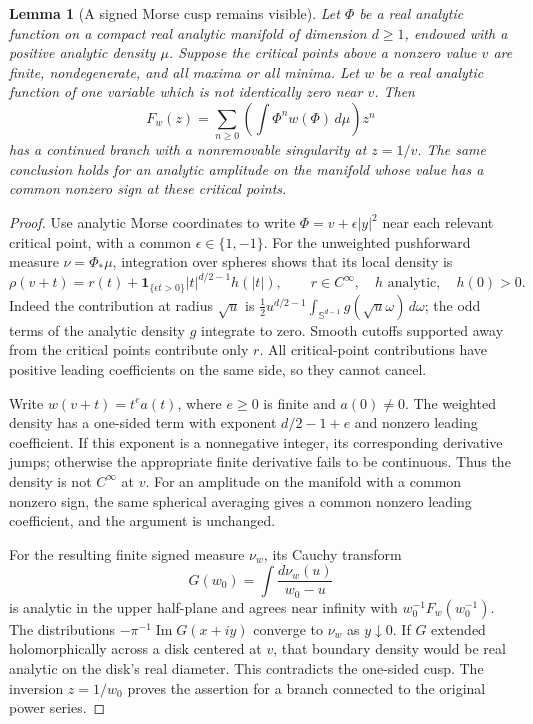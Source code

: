 \documentclass[11pt,a4paper]{article}
\newtheorem{lemma}[theorem]{Lemma}
\theoremstyle{definition}
\theoremstyle{remark}
\numberwithin{equation}{section}
\begin{document}
\begin{lemma}[A signed Morse cusp remains visible]\label{A:lem:morse-cusp}
Let $\Phi$ be a real analytic function on a compact real analytic
manifold of dimension $d\ge1$, endowed with a positive analytic density
$\mu$. Suppose the critical points above a nonzero value $v$ are finite,
nondegenerate, and all maxima or all minima. Let $w$ be a real analytic
function of one variable which is not identically zero near $v$. Then
\[
 F_w(z)=\sum_{n\ge0}\left(\int\Phi^n w(\Phi)\,d\mu\right)z^n
\]
has a continued branch with a nonremovable singularity at $z=1/v$.
The same conclusion holds for an analytic amplitude on the manifold
whose value has a common nonzero sign at these critical points.
\end{lemma}
\begin{proof}
Use analytic Morse coordinates to write $\Phi=v+\epsilon |y|^2$
near each relevant critical point, with a common $\epsilon\in\{1,-1\}$.
For the unweighted pushforward measure $\nu=\Phi_*\mu$, integration
over spheres shows that its local density is
\[
 \rho(v+t)=r(t)+\boldsymbol1_{\{\epsilon t>0\}}
 |t|^{d/2-1}h(|t|),\qquad r\in C^\infty,
 \quad h\text{ analytic},\quad h(0)>0.
\]
Indeed the contribution at radius $\sqrt{u}$ is
$\tfrac12u^{d/2-1}\int_{\mathbb S^{d-1}}g(\sqrt{u}\omega)\,d\omega$;
the odd terms of the analytic density $g$ integrate to zero. Smooth
cutoffs supported away from the critical points contribute only $r$.
All critical-point contributions have positive leading coefficients on
the same side, so they cannot cancel.

Write $w(v+t)=t^e a(t)$, where $e\ge0$ is finite and $a(0)\ne0$.
The weighted density has a one-sided term with exponent $d/2-1+e$
and nonzero leading coefficient. If this exponent is a nonnegative
integer, its corresponding derivative jumps; otherwise the appropriate
finite derivative fails to be continuous. Thus the density is not
$C^\infty$ at $v$. For an amplitude on the manifold with a common
nonzero sign, the same spherical averaging gives a common nonzero
leading coefficient, and the argument is unchanged.

For the resulting finite signed measure $\nu_w$, its Cauchy transform
\[
 G(w_0)=\int\frac{d\nu_w(u)}{w_0-u}
\]
is analytic in the upper half-plane and agrees near infinity with
$w_0^{-1}F_w(w_0^{-1})$. The distributions
$-\pi^{-1}\operatorname{Im}G(x+iy)$ converge to $\nu_w$ as $y\downarrow0$.
If $G$ extended holomorphically across a disk centered at $v$, that
boundary density would be real analytic on the disk's real diameter.
This contradicts the one-sided cusp. The inversion $z=1/w_0$ proves
the assertion for a branch connected to the original power series.
\end{proof}
\end{document}
